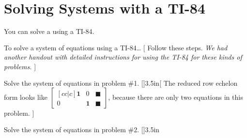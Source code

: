 \section{Solving Systems with a TI-84}

You can solve a  using a TI-84.

\begin{myConceptSteps}{To solve a system of equations using a TI-84\dots}
  [
    Follow these steps.
    {
      \itshape
      We had another handout with detailed instructions 
      for using the TI-84 for these kinds of problems.
    }
  ]
\end{myConceptSteps}

\myWideProblem
{
  Solve the system of equations in problem \#1.
}[\normalsize]{3.5in}[
  \footnotesize
  The reduced row echelon form looks like
  {\normalsize
  \(
    \begin{bmatrix}[cc|c]
        \boldsymbol{1} & 0  & \blacksquare \\
        0 & \boldsymbol{1}  & \blacksquare 
    \end{bmatrix}
\),
  }
 because there are only two equations in this problem.
]



\myWideProblem
{
  Solve the system of equations in problem \#2.
}[\normalsize]{3.5in}